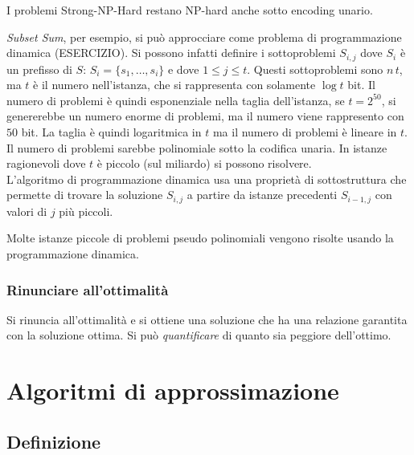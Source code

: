 I problemi Strong-NP-Hard restano NP-hard anche sotto encoding unario.

\emph{Subset Sum}, per esempio, si può approcciare come problema di programmazione dinamica (ESERCIZIO).
Si
possono infatti definire 
i sottoproblemi $S_{i, j}$ dove $S_i$ è un prefisso di $S$: $ S_i = \{ s_1, \dots, s_i \} $
e dove $1 \leq j \leq t$.
Questi sottoproblemi sono
$n \, t$, ma $t$ è il numero nell'istanza,
che si rappresenta con solamente $\log t$ bit.
Il numero di problemi è quindi esponenziale nella taglia dell'istanza, se $t = 2^{50}$, si genererebbe un numero enorme di problemi, ma il numero viene rappresento con $50$ bit.
La taglia è quindi logaritmica in $t$ ma il numero di problemi è lineare in $t$.
Il numero di problemi sarebbe polinomiale sotto la codifica unaria.
In istanze ragionevoli dove $t$ è piccolo (sul miliardo) si possono risolvere.
\\
L'algoritmo di programmazione dinamica usa una proprietà di sottostruttura che permette di trovare la soluzione $S_{i,j}$ a partire da istanze precedenti $S_{i-1,j}$ con valori di $j$ più piccoli.

Molte istanze piccole di problemi pseudo polinomiali vengono risolte usando la programmazione dinamica.

\subsubsection{Rinunciare all'ottimalità}

Si rinuncia all'ottimalità e si ottiene una soluzione che ha una relazione garantita con la soluzione ottima. Si può \emph{quantificare} di quanto sia peggiore dell'ottimo.

\section{Algoritmi di approssimazione}

\subsection{Definizione}

